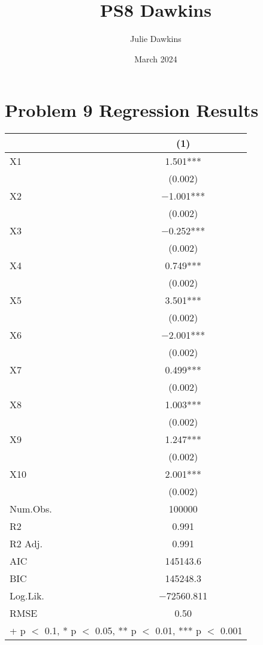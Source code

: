 \documentclass{article}
\title{PS8 Dawkins}
\author{Julie Dawkins}
\date{March 2024}
\begin{document}
\maketitle

\section{Problem 9 Regression Results}

\begin{table}[H]
\centering
\begin{tabular}[t]{lc}
\toprule
  & (1)\\
\midrule
X1 & \num{1.501}***\\
 & \vphantom{9} (\num{0.002})\\
X2 & \num{-1.001}***\\
 & \vphantom{8} (\num{0.002})\\
X3 & \num{-0.252}***\\
 & \vphantom{7} (\num{0.002})\\
X4 & \num{0.749}***\\
 & \vphantom{6} (\num{0.002})\\
X5 & \num{3.501}***\\
 & \vphantom{5} (\num{0.002})\\
X6 & \num{-2.001}***\\
 & \vphantom{4} (\num{0.002})\\
X7 & \num{0.499}***\\
 & \vphantom{3} (\num{0.002})\\
X8 & \num{1.003}***\\
 & \vphantom{2} (\num{0.002})\\
X9 & \num{1.247}***\\
 & \vphantom{1} (\num{0.002})\\
X10 & \num{2.001}***\\
 & (\num{0.002})\\
\midrule
Num.Obs. & \num{100000}\\
R2 & \num{0.991}\\
R2 Adj. & \num{0.991}\\
AIC & \num{145143.6}\\
BIC & \num{145248.3}\\
Log.Lik. & \num{-72560.811}\\
RMSE & \num{0.50}\\
\bottomrule
\multicolumn{2}{l}{\rule{0pt}{1em}+ p $<$ 0.1, * p $<$ 0.05, ** p $<$ 0.01, *** p $<$ 0.001}\\
\end{tabular}
\end{table}
\end{document}
